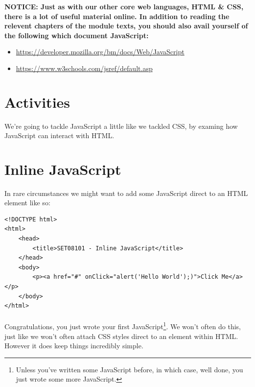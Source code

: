 \documentclass[10pt, a4paper, twosize]{article}
\begin{document}
\begin{framed}
{\bf{NOTICE:} Just as with our other core web languages, HTML \& CSS, there is a lot of useful material online. In addition to reading the relevent chapters of the module texts, you should also avail yourself of the following which document JavaScript:
\begin{itemize}
\item \url{https://developer.mozilla.org/bm/docs/Web/JavaScript}
\item \url{https://www.w3schools.com/jsref/default.asp}
\end{itemize}
  }
\end{framed}


\section{Activities}
\paragraph{} We're going to tackle JavaScript a little like we tackled CSS, by examing how JavaScript can interact with HTML.

\section{Inline JavaScript}

\paragraph{} In rare circumstances we might want to add some JavaScript direct to an HTML element like so:

\begin{lstlisting}
<!DOCTYPE html>
<html>
    <head>
        <title>SET08101 - Inline JavaScript</title>
    </head>
    <body>
        <p><a href="#" onClick="alert('Hello World');)">Click Me</a></p> 
    </body>
</html>
\end{lstlisting}

\paragraph{} Congratulations, you just wrote your first JavaScript\footnote{Unless you've written some JavaScript before, in which case, well done, you just wrote some more JavaScript.}. We won't often do this, just like we won't often attach CSS styles direct to an element within HTML. However it does keep things incredibly simple.
\end{document}
